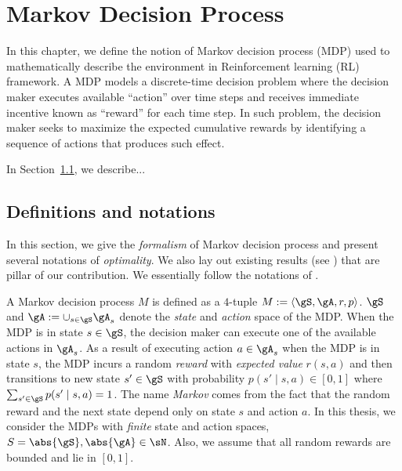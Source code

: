 
\chapter{Markov Decision Process}
\label{ch:mdp}


In this chapter, we define the notion of Markov decision process (MDP) used to mathematically describe the environment in Reinforcement learning (RL) framework.
A MDP models a discrete-time decision problem where the decision maker executes available ``action'' over time steps and receives immediate incentive known as ``reward'' for each time step.
In such problem, the decision maker seeks to maximize the expected cumulative rewards by identifying a sequence of actions that produces such effect.

In Section~\ref{ch:mdp:sec:defn}, we describe...


\section{Definitions and notations}
\label{ch:mdp:sec:defn}

In this section, we give the \emph{formalism} of Markov decision process and present several notations of \emph{optimality}.
We also lay out existing results (see \cite{puterman2014markov}) that are pillar of our contribution.
We essentially follow the notations of \cite{puterman2014markov}.

A Markov decision process $M$ is defined as a $4$-tuple $M:=\langle\gS, \gA, r, p\rangle$.
$\gS$ and $\gA:=\cup_{s\in\gS}\gA_s$ denote the \emph{state} and \emph{action} space of the MDP.
When the MDP is in state $s\in\gS$, the decision maker can execute one of the available actions in $\gA_s$.
As a result of executing action $a\in\gA_s$ when the MDP is in state $s$, the MDP incurs a random \emph{reward} with \emph{expected value} $r(s,a)$ and then transitions to new state $s'\in\gS$ with probability $p(s'\mid s, a)\in[0,1]$ where $\sum_{s'\in\gS}p(s'\mid s,a)=1$.
The name \emph{Markov} comes from the fact that the random reward and the next state depend only on state $s$ and action $a$.
In this thesis, we consider the MDPs with \emph{finite} state and action spaces, $S=\abs{\gS}, \abs{\gA}\in\sN$.
Also, we assume that all random rewards are bounded and lie in $[0,1]$.

